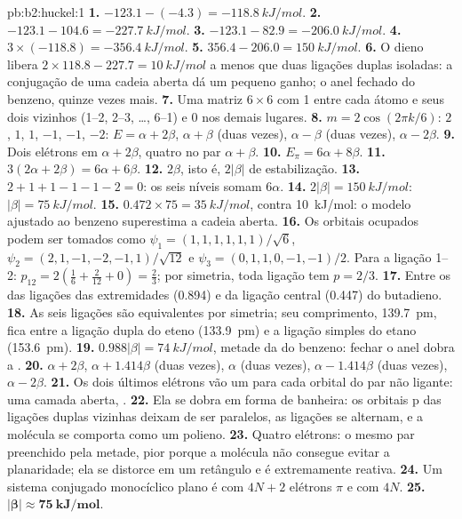 \begin{solution}{pb:b2:huckel:1}
\textbf{1.} $-123.1 - (-4.3) = \qty{-118.8}{kJ/mol}$.
\textbf{2.} $-123.1 - 104.6 = \qty{-227.7}{kJ/mol}$.
\textbf{3.} $-123.1 - 82.9 = \qty{-206.0}{kJ/mol}$.
\textbf{4.} $3 \times (-118.8) = \qty{-356.4}{kJ/mol}$.
\textbf{5.} $356.4 - 206.0 = \qty{150}{kJ/mol}$.
\textbf{6.} O dieno libera $2 \times 118.8 - 227.7 = \qty{10}{kJ/mol}$ a menos que duas
ligações duplas isoladas: a conjugação de uma cadeia aberta dá um pequeno
ganho; o anel fechado do benzeno, quinze vezes mais.
\textbf{7.} Uma matriz $6 \times 6$ com 1 entre cada átomo e seus dois vizinhos (1--2, 2--3,
\dots, 6--1) e 0 nos demais lugares.
\textbf{8.} $m = 2\cos(2\pi k/6)$: $2$, $1$, $1$, $-1$, $-1$, $-2$: $E = \alpha + 2\beta$, $\alpha + \beta$ (duas vezes),
$\alpha - \beta$ (duas vezes), $\alpha - 2\beta$.
\textbf{9.} Dois elétrons em $\alpha + 2\beta$, quatro no par $\alpha + \beta$.
\textbf{10.} $E_\pi = 6\alpha + 8\beta$.
\textbf{11.} $3(2\alpha + 2\beta) = 6\alpha + 6\beta$.
\textbf{12.} $2\beta$, isto é, $2|\beta|$ de estabilização.
\textbf{13.} $2 + 1 + 1 - 1 - 1 - 2 = 0$: os seis níveis somam $6\alpha$.
\textbf{14.} $2|\beta| = \qty{150}{kJ/mol}$: $|\beta| = \qty{75}{kJ/mol}$.
\textbf{15.} $0.472 \times 75 = \qty{35}{kJ/mol}$, contra \qty{10}{kJ/mol}: o modelo ajustado
ao benzeno superestima a cadeia aberta.
\textbf{16.} Os orbitais ocupados podem ser tomados como $\psi_1 = (1, 1, 1, 1, 1, 1)/\sqrt6$,
$\psi_2 = (2, 1, -1, -2, -1, 1)/\sqrt{12}$ e $\psi_3 = (0, 1, 1, 0, -1, -1)/2$. Para a ligação
1--2: $p_{12} = 2(\frac16 + \frac{2}{12} + 0) = \frac23$; por simetria, toda ligação tem $p = 2/3$.
\textbf{17.} Entre os das ligações das extremidades (0.894) e da ligação central
(0.447) do butadieno.
\textbf{18.} As seis ligações são equivalentes por simetria; seu comprimento,
\qty{139.7}{pm}, fica entre a ligação dupla do eteno (\qty{133.9}{pm}) e a
ligação simples do etano (\qty{153.6}{pm}).
\textbf{19.} $0.988|\beta| = \qty{74}{kJ/mol}$, metade da do benzeno: fechar o anel
dobra a .
\textbf{20.} $\alpha + 2\beta$, $\alpha + 1.414\beta$ (duas vezes), $\alpha$ (duas vezes), $\alpha - 1.414\beta$ (duas vezes),
$\alpha - 2\beta$.
\textbf{21.} Os dois últimos elétrons vão um para cada orbital do par não
ligante: uma camada aberta, .
\textbf{22.} Ela se dobra em forma de banheira: os orbitais p das ligações
duplas vizinhas deixam de ser paralelos, as ligações se alternam, e a molécula
se comporta como um polieno.
\textbf{23.} Quatro elétrons: o mesmo par preenchido pela metade, pior porque a
molécula não consegue evitar a planaridade; ela se distorce em um retângulo e
é extremamente reativa.
\textbf{24.} Um sistema conjugado monocíclico plano é  com $4N + 2$
elétrons $\pi$ e  com $4N$.
\textbf{25.} $\boldsymbol{|\beta| \approx \qty{75}{kJ/mol}}$.
\end{solution}

